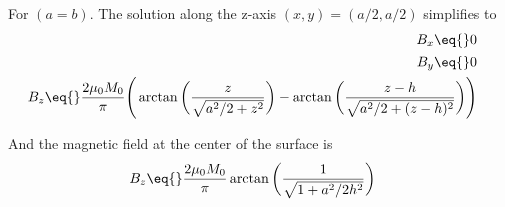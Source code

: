 \documentclass[\main/dresen_thesis.tex]{subfiles}
\begin{document}
For $(a=b)$. The solution along the z-axis $(x,y)=(a/2, a/2)$ simplifies to 
\begin{align}
  \begin{split}
    B_x \eq {}& 0
  \end{split} \\
  \begin{split}
    B_y \eq {}& 0
  \end{split} \\
  \begin{split}
    B_z \eq {}& \frac{2 \mu_0 M_0}{\pi} \Bigg( 
              \arctan \bigg( \frac{z}{\sqrt{a^2/2 + z^2}} \bigg) -
              \arctan \bigg( \frac{z - h}{\sqrt{a^2/2 + (z-h)^2}} \bigg) \Bigg)
  \end{split}
\end{align}

And the magnetic field at the center of the surface is
\begin{align}
  B_z \eq {}& \frac{2 \mu_0 M_0}{\pi} 
              \arctan \bigg( \frac{1}{\sqrt{1 + a^2/2h^2}} \bigg)
\end{align}

\end{document}
